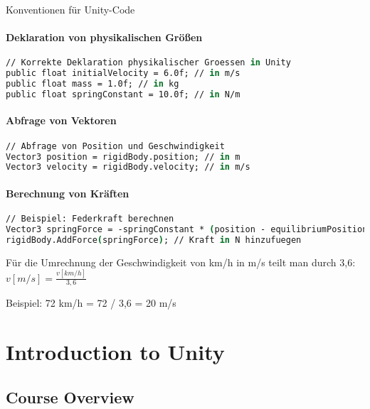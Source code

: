 \begin{KR}{Konventionen für Unity-Code}\\
    \paragraph{Deklaration von physikalischen Größen}
    \begin{lstlisting}[language=csh, style=basesmol]
// Korrekte Deklaration physikalischer Groessen in Unity
public float initialVelocity = 6.0f; // in m/s
public float mass = 1.0f; // in kg
public float springConstant = 10.0f; // in N/m
    \end{lstlisting}
    
    \paragraph{Abfrage von Vektoren}
    \begin{lstlisting}[language=csh, style=basesmol]
// Abfrage von Position und Geschwindigkeit
Vector3 position = rigidBody.position; // in m
Vector3 velocity = rigidBody.velocity; // in m/s
    \end{lstlisting}
    
    \paragraph{Berechnung von Kräften}
    \begin{lstlisting}[language=csh, style=basesmol]
// Beispiel: Federkraft berechnen
Vector3 springForce = -springConstant * (position - equilibriumPosition);
rigidBody.AddForce(springForce); // Kraft in N hinzufuegen
    \end{lstlisting}
\end{KR}

\begin{example}
    Für die Umrechnung der Geschwindigkeit von km/h in m/s teilt man durch 3,6:
    $v[m/s] = \frac{v[km/h]}{3,6}$
    
    Beispiel: 72 km/h = 72 / 3,6 = 20 m/s
\end{example}

\section{Introduction to Unity}

\subsection{Course Overview}

